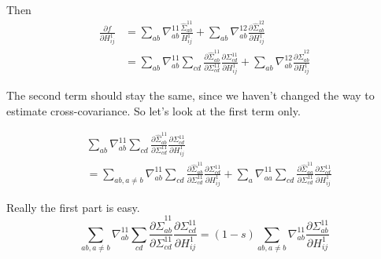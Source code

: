 \documentclass[12pt]{article}
\begin{document}
Then 
\begin{align*}
  \frac{\partial f}{\partial H^1_{ij}} 
&= \sum_{ab}\nabla^{11}_{ab}\frac{\hat\Sigma^{11}_{ab}}{H^1_{ij}} 
  + \sum_{ab} \nabla^{12}_{ab}\frac{\partial\hat\Sigma^{12}_{ab}}{\partial H^1_{ij}}\\
&= \sum_{ab}\nabla^{11}_{ab} \sum_{cd}\frac{\partial \hat\Sigma_{ab}^{11}}{\partial \Sigma_{cd}^{11}} \frac{\partial \Sigma^{11}_{cd}}{\partial H^1_{ij}}
  + \sum_{ab} \nabla^{12}_{ab}\frac{\partial\hat\Sigma^{12}_{ab}}{\partial H^1_{ij}}
\end{align*}

The second term should stay the same, since we haven't changed the way to estimate cross-covariance. So let's look at the first term only.

\begin{align*}
&\sum_{ab}\nabla^{11}_{ab} \sum_{cd}\frac{\partial \hat\Sigma_{ab}^{11}}{\partial \Sigma_{cd}^{11}} \frac{\partial \Sigma^{11}_{cd}}{\partial H^1_{ij}} \\
&= \sum_{ab, a\neq b}\nabla^{11}_{ab} \sum_{cd}\frac{\partial \hat\Sigma_{ab}^{11}}{\partial \Sigma_{cd}^{11}} \frac{\partial \Sigma^{11}_{cd}}{\partial H^1_{ij}}
  + \sum_{a}\nabla^{11}_{aa} \sum_{cd}\frac{\partial \hat\Sigma_{aa}^{11}}{\partial \Sigma_{cd}^{11}} \frac{\partial \Sigma^{11}_{cd}}{\partial H^1_{ij}}
\end{align*}

Really the first part is easy. 
\[\sum_{ab, a\neq b}\nabla^{11}_{ab} \sum_{cd}\frac{\partial \hat\Sigma_{ab}^{11}}{\partial \Sigma_{cd}^{11}} \frac{\partial \Sigma^{11}_{cd}}{\partial H^1_{ij}}= (1-s)\sum_{ab, a\neq b}\nabla^{11}_{ab} \frac{\partial\Sigma^{11}_{ab}}{\partial H^1_{ij}}\]
\end{document}
